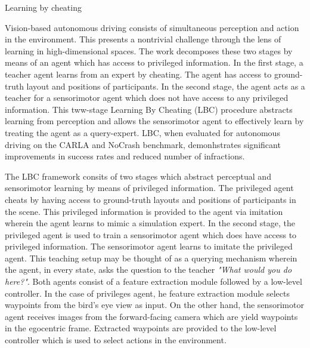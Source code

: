 \documentclass[11pt,letterpaper]{article}
\begin{document}
\begin{center}
  \large{Learning by cheating}
\end{center}

Vision-based autonomous driving consists of simultaneous perception and action in the environment. This presents a nontrivial challenge through the lens of learning in high-dimensional spaces. The work decomposes these two stages by means of an agent which has access to privileged information. In the first stage, a teacher agent learns from an expert by cheating. The agent has access to ground-truth layout and positions of participants. In the second stage, the agent acts as a teacher for a sensorimotor agent which does not have access to any privileged information. This tww-stage Learning By Cheating (LBC) procedure abstracts learning from perception and allows the sensorimotor agent to effectively learn by treating the agent as a query-expert. LBC, when evaluated for autonomous driving on the CARLA and NoCrash benchmark, demonhstrates significant improvements in success rates and reduced number of infractions.

The LBC framework consits of two stages which abstract perceptual and sensorimotor learning by means of privileged information. The privileged agent cheats by having access to ground-truth layouts and positions of participants in the scene. This privileged information is provided to the agent via imitation wherein the agent learns to mimic a simulation expert. In the second stage, the privileged agent is used to train a sensorimotor agent which does have access to privileged information. The sensorimotor agent learns to imitate the privileged agent. This teaching setup may be thought of as a querying mechanism wherein the agent, in every state, asks the question to the teacher \textit{"What would you do here?"}. Both agents consist of a feature extraction module followed by a low-level controller. In the case of privileges agent, he feature extraction module selects waypoints from the bird's eye view as input. On the other hand, the sensorimotor agent receives images from the forward-facing camera which are yield waypoints in the egocentric frame. Extracted waypoints are provided to the low-level controller which is used to select actions in the environment. 
\end{document}
